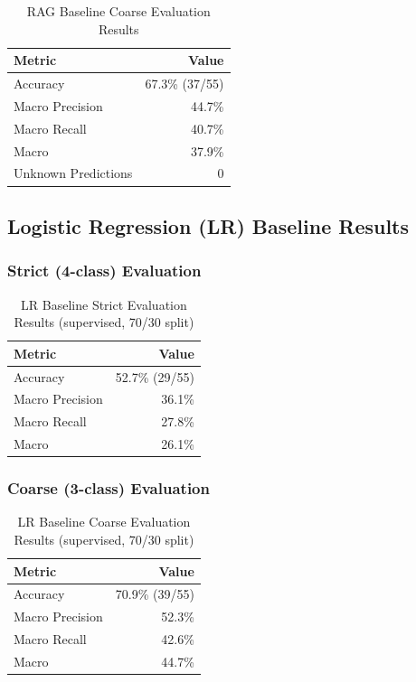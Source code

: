 \begin{table}[H]
\centering
\caption{RAG Baseline Coarse Evaluation Results}
\label{tab:rag-coarse}
\begin{tabular}{lr}
\toprule
\textbf{Metric} & \textbf{Value} \\
\midrule
Accuracy            & 67.3\% (37/55) \\
Macro Precision     & 44.7\% \\
Macro Recall        & 40.7\% \\
Macro \fone{}       & 37.9\% \\
Unknown Predictions & 0 \\
\bottomrule
\end{tabular}
\end{table}

\subsection{Logistic Regression (LR) Baseline Results}

\subsubsection{Strict (4-class) Evaluation}

\begin{table}[H]
\centering
\caption{LR Baseline Strict Evaluation Results (supervised, 70/30 split)}
\label{tab:lr-strict}
\begin{tabular}{lr}
\toprule
\textbf{Metric} & \textbf{Value} \\
\midrule
Accuracy            & 52.7\% (29/55) \\
Macro Precision     & 36.1\% \\
Macro Recall        & 27.8\% \\
Macro \fone{}       & 26.1\% \\
\bottomrule
\end{tabular}
\end{table}

\subsubsection{Coarse (3-class) Evaluation}

\begin{table}[H]
\centering
\caption{LR Baseline Coarse Evaluation Results (supervised, 70/30 split)}
\label{tab:lr-coarse}
\begin{tabular}{lr}
\toprule
\textbf{Metric} & \textbf{Value} \\
\midrule
Accuracy            & 70.9\% (39/55) \\
Macro Precision     & 52.3\% \\
Macro Recall        & 42.6\% \\
Macro \fone{}       & 44.7\% \\
\bottomrule
\end{tabular}
\end{table}

